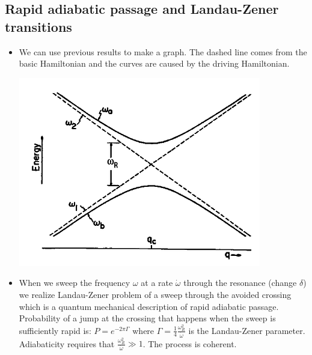 \documentclass[AtomicOptical1Notes.tex]{subfiles}
\begin{document}
	\subsection{Rapid adiabatic passage and Landau-Zener transitions}
		\begin{itemize}
			\item We can use previous results to make a graph. The dashed line comes from the basic Hamiltonian and the curves are caused by the driving Hamiltonian. 
			
			\begin{center}\includegraphics[scale=0.75]{landauzener}\end{center}
			
			\item When we sweep the frequency $\omega$ at a rate $\dot\omega$ through the resonance (change $\delta$) we realize Landau-Zener problem of a sweep through the avoided crossing which is a quantum mechanical description of rapid adiabatic passage. Probability of a jump at the crossing that happens when the sweep is sufficiently rapid is: $ P=e^{-2\pi\Gamma} $ where $ \Gamma = \frac{1}{4}\frac{\omega_R^2}{\dot\omega} $ is the Landau-Zener parameter. Adiabaticity requires that $ \frac{\omega_R^2}{\dot\omega}\gg 1 $. The process is coherent.
			
		\end{itemize}
\end{document}
